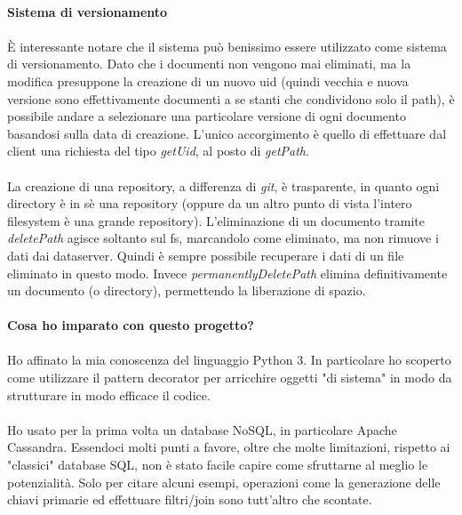 \documentclass{article}
\begin{document}
\paragraph{Sistema di versionamento}

\paragraph{} È interessante notare che il sistema può benissimo essere utilizzato come sistema di versionamento. Dato che i documenti non vengono mai eliminati, ma la modifica presuppone la creazione di un nuovo uid (quindi vecchia e nuova versione sono effettivamente documenti a se stanti che condividono solo il path), è possibile andare a selezionare una particolare versione di ogni documento basandosi sulla data di creazione. L'unico accorgimento è quello di effettuare dal client una richiesta del tipo \emph{getUid}, al posto di \emph{getPath}.

\paragraph{} La creazione di una repository, a differenza di \emph{git}, è trasparente, in quanto ogni directory è in sè una repository (oppure da un altro punto di vista l'intero filesystem è una grande repository). L'eliminazione di un documento tramite \emph{deletePath} agisce soltanto sul fs, marcandolo come eliminato, ma non rimuove i dati dai dataserver. Quindi è sempre possibile recuperare i dati di un file eliminato in questo modo. Invece \emph{permanentlyDeletePath} elimina definitivamente un documento (o directory), permettendo la liberazione di spazio. 

\paragraph{Cosa ho imparato con questo progetto?}

\paragraph{} Ho affinato la mia conoscenza del linguaggio Python 3. In particolare ho scoperto come utilizzare il pattern decorator per arricchire oggetti "di sistema" in modo da strutturare in modo efficace il codice. 

\paragraph{} Ho usato per la prima volta un database NoSQL, in particolare Apache Cassandra. Essendoci molti punti a favore, oltre che molte limitazioni, rispetto ai "classici" database SQL, non è stato facile capire come sfruttarne al meglio le potenzialità. Solo per citare alcuni esempi, operazioni come la generazione delle chiavi primarie ed effettuare filtri/join sono tutt'altro che scontate. 
\end{document}

